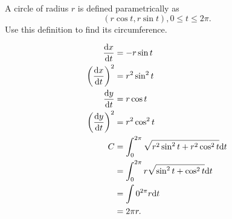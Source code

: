 \begin{example}
	A circle of radius $r$ is defined parametrically as
	\begin{equation*}
		(r\cos{t}, r\sin{t}), 0 \leq t \leq 2\pi.
	\end{equation*}
	Use this definition to find its circumference.
\end{example}
\begin{align*}
	\frac{\mathrm{d} x}{\mathrm{d} t} &= -r\sin{t} \\
	\left(\frac{\mathrm{d} x}{\mathrm{d} t}\right)^2 &= r^2\sin^2{t} \\
	\frac{\mathrm{d} y}{\mathrm{d} t} &= r\cos{t} \\
	\left(\frac{\mathrm{d} y}{\mathrm{d} t}\right)^2 &= r^2\cos^2{t} \\
	C &= \int_{0}^{2\pi}{\sqrt{r^2\sin^2{t}+r^2\cos^2{t}}\mathrm{d} t} \\
	&= \int_{0}^{2\pi}{r\sqrt{\sin^2{t}+\cos^2{t}}\mathrm{d} t} \\
	&= \int{0}^{2\pi}{r\mathrm{d} t} \\
	&= 2\pi r.
\end{align*}